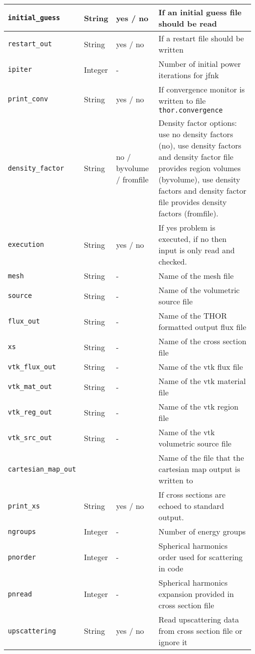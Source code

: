 \begin{longtable}[H]{l l l l}
    \verb"initial_guess" & String & yes / no & If an initial guess file should be read\\ \hline
    \verb"restart_out" & String & yes / no & If a restart file should be written \\ \hline
    \verb"ipiter" & Integer & - & Number of initial power iterations for jfnk\\ \hline
    \verb"print_conv" & String & yes / no & If convergence monitor is written to file \verb"thor.convergence"\\ \hline
    \verb"density_factor" & String & no / byvolume / fromfile  & Density factor options: use no density factors (no), use density factors and density factor file provides region volumes (byvolume), use density factors and density factor file provides density factors (fromfile). \\ \hline
    \verb"execution" & String & yes / no & If yes problem is executed, if no then input is only read and checked.\\ \hline
    \verb"mesh"&String& -& Name of the mesh file\\ \hline
    \verb"source"&String& -& Name of the volumetric source file\\ \hline
    \verb"flux_out"&String& -& Name of the THOR formatted output flux file\\ \hline
    \verb"xs"&String& -& Name of the cross section file\\ \hline
    \verb"vtk_flux_out"&String& -& Name of the vtk flux file\\ \hline
    \verb"vtk_mat_out"&String& -& Name of the vtk material file\\ \hline
    \verb"vtk_reg_out"&String& -& Name of the vtk region file\\ \hline
    \verb"vtk_src_out"&String& -& Name of the vtk volumetric source file\\ \hline
    \verb"cartesian_map_out"&&&Name of the file that the cartesian map output is written to\\ \hline
    \verb"print_xs"&String& yes / no& If cross sections are echoed to standard output.\\ \hline
    \verb"ngroups"&Integer& -& Number of energy groups\\ \hline
    \verb"pnorder"&Integer& -& Spherical harmonics order used for scattering in code\\ \hline
    \verb"pnread"&Integer& -& Spherical harmonics expansion provided in cross section file\\ \hline
    \verb"upscattering" & String & yes / no & Read upscattering data from cross section file or ignore it \\ \hline

\end{longtable}

